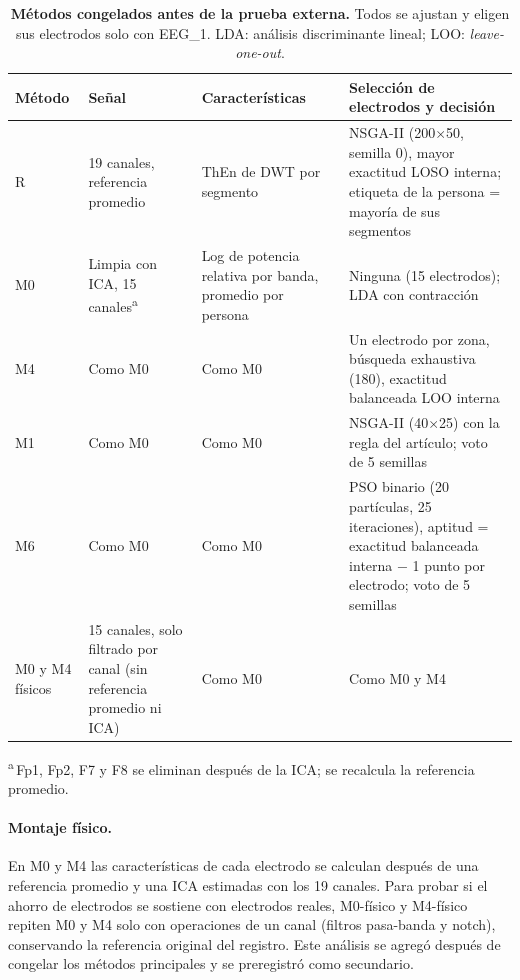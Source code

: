 \begin{table}[t]
\centering\footnotesize
\caption{\textbf{Métodos congelados antes de la prueba externa.} Todos se ajustan y eligen sus electrodos solo con EEG\_1. LDA: análisis discriminante lineal; LOO: \emph{leave-one-out}.}
\label{tab:methods}
\begin{tabular}{@{}p{1.7cm}p{3.6cm}p{3.1cm}p{5.4cm}@{}}
\toprule
Método & Señal & Características & Selección de electrodos y decisión \\
\midrule
R & 19 canales, referencia promedio & ThEn de DWT por segmento & NSGA-II (200$\times$50, semilla 0), mayor exactitud LOSO interna; etiqueta de la persona = mayoría de sus segmentos \\
M0 & Limpia con ICA, 15 canales\textsuperscript{a} & Log de potencia relativa por banda, promedio por persona & Ninguna (15 electrodos); LDA con contracción \\
M4 & Como M0 & Como M0 & Un electrodo por zona, búsqueda exhaustiva (180), exactitud balanceada LOO interna \\
M1 & Como M0 & Como M0 & NSGA-II (40$\times$25) con la regla del artículo; voto de 5 semillas \\
M6 & Como M0 & Como M0 & PSO binario (20 partículas, 25 iteraciones), aptitud = exactitud balanceada interna $-$ 1 punto por electrodo; voto de 5 semillas \\
M0 y M4 físicos & 15 canales, solo filtrado por canal (sin referencia promedio ni ICA) & Como M0 & Como M0 y M4 \\
\bottomrule
\end{tabular}

\smallskip\raggedright \textsuperscript{a}\,Fp1, Fp2, F7 y F8 se eliminan después de la ICA; se recalcula la referencia promedio.
\end{table}

\paragraph{Montaje físico.} En M0 y M4 las características de cada electrodo se calculan después de una referencia promedio y una ICA estimadas con los 19 canales. Para probar si el ahorro de electrodos se sostiene con electrodos reales, M0-físico y M4-físico repiten M0 y M4 solo con operaciones de un canal (filtros pasa-banda y notch), conservando la referencia original del registro. Este análisis se agregó después de congelar los métodos principales y se preregistró como secundario.

